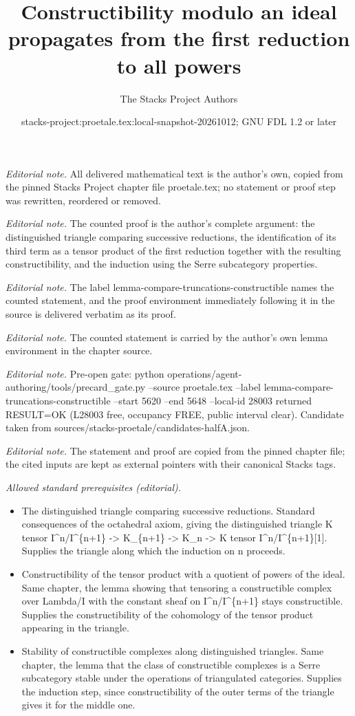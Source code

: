 \documentclass[10pt,a4paper]{amsart}
\title{Constructibility modulo an ideal propagates from the first reduction to all powers}
\author{The Stacks Project Authors}
\date{stacks-project:proetale.tex:local-snapshot-20261012; GNU FDL 1.2 or later}
\theoremstyle{plain}
\theoremstyle{definition}
\theoremstyle{remark}
\numberwithin{equation}{subsection}
\begin{document}
\maketitle
\noindent\textit{Editorial note.} All delivered mathematical text is the author's own, copied from the pinned Stacks Project chapter file proetale.tex; no statement or proof step was rewritten, reordered or removed.\par\medskip
\noindent\textit{Editorial note.} The counted proof is the author's complete argument: the distinguished triangle comparing successive reductions, the identification of its third term as a tensor product of the first reduction together with the resulting constructibility, and the induction using the Serre subcategory properties.\par\medskip
\noindent\textit{Editorial note.} The label lemma-compare-truncations-constructible names the counted statement, and the proof environment immediately following it in the source is delivered verbatim as its proof.\par\medskip
\noindent\textit{Editorial note.} The counted statement is carried by the author's own lemma environment in the chapter source.\par\medskip
\noindent\textit{Editorial note.} Pre-open gate: python operations/agent-authoring/tools/precard\_gate.py --source proetale.tex --label lemma-compare-truncations-constructible --start 5620 --end 5648 --local-id 28003 returned RESULT=OK (L28003 free, occupancy FREE, public interval clear). Candidate taken from sources/stacks-proetale/candidates-halfA.json.\par\medskip
\noindent\textit{Editorial note.} The statement and proof are copied from the pinned chapter file; the cited inputs are kept as external pointers with their canonical Stacks tags.\par\medskip
\noindent\textit{Allowed standard prerequisites (editorial).}\begin{itemize}
\item The distinguished triangle comparing successive reductions. Standard consequences of the octahedral axiom, giving the distinguished triangle K tensor I\textasciicircum{}n/I\textasciicircum{}\{n+1\} -> K\_\{n+1\} -> K\_n -> K tensor I\textasciicircum{}n/I\textasciicircum{}\{n+1\}[1]. Supplies the triangle along which the induction on n proceeds.
\item Constructibility of the tensor product with a quotient of powers of the ideal. Same chapter, the lemma showing that tensoring a constructible complex over Lambda/I with the constant sheaf on I\textasciicircum{}n/I\textasciicircum{}\{n+1\} stays constructible. Supplies the constructibility of the cohomology of the tensor product appearing in the triangle.
\item Stability of constructible complexes along distinguished triangles. Same chapter, the lemma that the class of constructible complexes is a Serre subcategory stable under the operations of triangulated categories. Supplies the induction step, since constructibility of the outer terms of the triangle gives it for the middle one.
\end{itemize}\medskip
\end{document}
